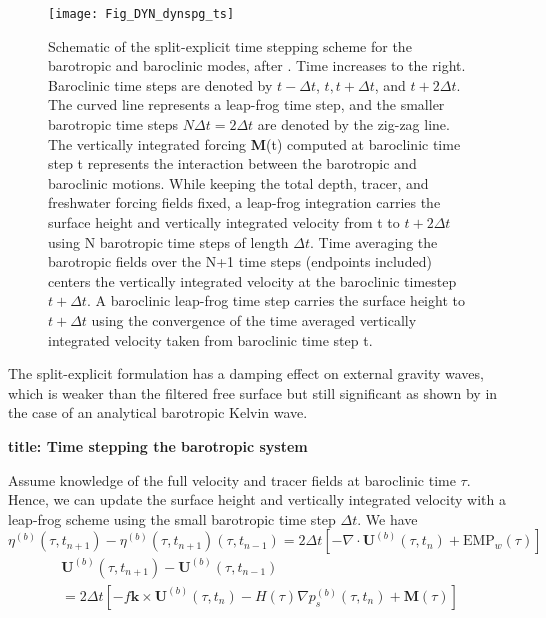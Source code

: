 \documentclass[../main/NEMO_manual]{subfiles}
\begin{document}
\begin{figure}[!t]
  \begin{center}
    \texttt{[image: Fig\_DYN\_dynspg\_ts]}
    \caption{
      \protect\label{fig:DYN_dynspg_ts}
      Schematic of the split-explicit time stepping scheme for the barotropic and baroclinic modes,
      after \citet{Griffies2004}.
      Time increases to the right.
      Baroclinic time steps are denoted by $t-\Delta t$, $t, t+\Delta t$, and $t+2\Delta t$.
      The curved line represents a leap-frog time step,
      and the smaller barotropic time steps $N \Delta t=2\Delta t$ are denoted by the zig-zag line.
      The vertically integrated forcing \textbf{M}(t) computed at
      baroclinic time step t represents the interaction between the barotropic and baroclinic motions.
      While keeping the total depth, tracer, and freshwater forcing fields fixed,
      a leap-frog integration carries the surface height and vertically integrated velocity from
      t to $t+2 \Delta t$ using N barotropic time steps of length $\Delta t$.
      Time averaging the barotropic fields over the N+1 time steps (endpoints included)
      centers the vertically integrated velocity at the baroclinic timestep $t+\Delta t$.
      A baroclinic leap-frog time step carries the surface height to $t+\Delta t$ using the convergence of
      the time averaged vertically integrated velocity taken from baroclinic time step t.
    }
  \end{center}
\end{figure}

The split-explicit formulation has a damping effect on external gravity waves,
which is weaker than the filtered free surface but still significant as shown by \citet{Levier2007} in
the case of an analytical barotropic Kelvin wave. 


\textbf{title: Time stepping the barotropic system }

Assume knowledge of the full velocity and tracer fields at baroclinic time $\tau$.
Hence, we can update the surface height and vertically integrated velocity with a leap-frog scheme using
the small barotropic time step $\Delta t$.
We have
\[
  \eta^{(b)}(\tau,t_{n+1}) - \eta^{(b)}(\tau,t_{n+1}) (\tau,t_{n-1})
  = 2 \Delta t \left[-\nabla \cdot \textbf{U}^{(b)}(\tau,t_n) + \text{EMP}_w(\tau) \right] 
\]
\begin{multline*}
  \textbf{U}^{(b)}(\tau,t_{n+1}) - \textbf{U}^{(b)}(\tau,t_{n-1})  \\
  = 2\Delta t \left[ - f \textbf{k} \times \textbf{U}^{(b)}(\tau,t_{n})
    - H(\tau) \nabla p_s^{(b)}(\tau,t_{n}) +\textbf{M}(\tau) \right]
\end{multline*}
\
\end{document}
